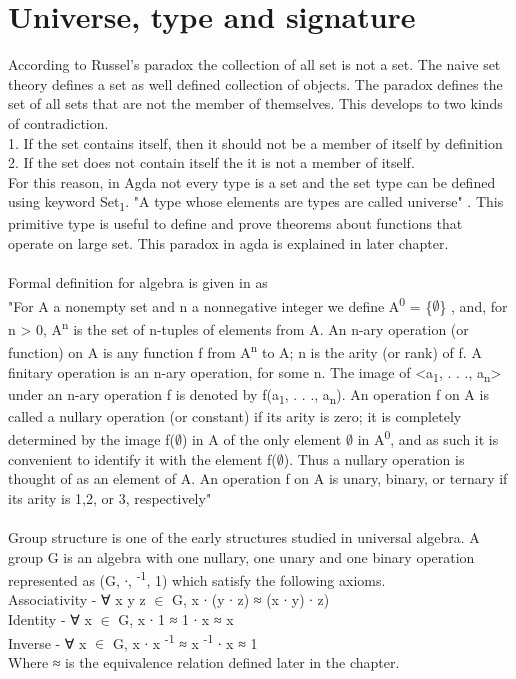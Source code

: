 \section{Universe, type and signature}
According to Russel's paradox \cite{russell2020principles} the collection of all set is not a set. The naive set theory defines a set as well defined collection of objects. The paradox defines the set of all sets that are not the member of themselves. This develops to two kinds of contradiction. \cite{russelPara}\\
1. If the set contains itself, then it should not be a member of itself by definition\\
2. If the set does not contain itself the it is not a member of itself.\\
For this reason, in Agda not every type is a set and the set type can be defined using keyword Set\textsubscript{1}. "A type whose elements are types are called universe" \cite{universeagda}. This primitive type is useful to define and prove theorems about functions that operate on large set. This paradox in agda is explained in later chapter.\\
\\
Formal definition for algebra is given in \cite{sankappanavar1981course} as \\ "For A a nonempty set and n a nonnegative integer we define A\textsuperscript{0} = \{\(\emptyset\)\} , and, for n > 0, A\textsuperscript{n} is the set of n-tuples of elements from A. An n-ary operation (or function) on A is any function f from A\textsuperscript{n} to A; n is the arity (or rank) of f. A finitary operation is an n-ary operation, for some n. The image of <a\textsubscript{1}, . . ., a\textsubscript{n}> under an n-ary operation f is denoted by f(a\textsubscript{1}, . . ., a\textsubscript{n}). An operation f on A is called a nullary operation (or constant) if its arity is zero; it is completely determined by the image f(\(\emptyset\)) in A of the only element \(\emptyset\) in A\textsuperscript{0}, and as such it is convenient to identify it with the element f(\(\emptyset\)). Thus a nullary operation is thought of as an element of A. An operation f on A is unary, binary, or ternary if its arity is 1,2, or 3, respectively"\\ \\
Group structure is one of the early structures studied in universal algebra. A group G is an algebra with one nullary, one unary and one binary operation represented as (G, ∙, \textsuperscript{-1}, 1) which satisfy the following axioms. \\
Associativity - ∀ x y z \(\in\) G, x ∙ (y ∙ z) ≈ (x ∙ y) ∙ z)\\
Identity - ∀ x \(\in\) G, x ∙ 1 ≈ 1 ∙ x ≈ x\\
Inverse - ∀ x \(\in\) G, x ∙ x \textsuperscript{-1} ≈  x \textsuperscript{-1} ∙ x ≈ 1\\
Where ≈ is the equivalence relation defined later in the chapter.\\

